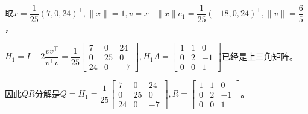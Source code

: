     \begin{solution}
        取$x=\dfrac1{25}(7,0,24)^{\top},\|x\|=1,v=x-\|x\|e_1=\dfrac1{25}(-18,0,24)^{\top},\|v\|=\dfrac65$，

        $H_1=I-2\dfrac{vv^{\top}}{v^{\top}v}=\dfrac1{25}\begin{bmatrix}7&0&24\\0&25&0\\24&0&-7\end{bmatrix},H_1 A=\begin{bmatrix}1&1&0\\0&2&-1\\0&0&1\end{bmatrix}$已经是上三角矩阵。

        因此$QR$分解是$Q=H_1=\dfrac1{25}\begin{bmatrix}7&0&24\\0&25&0\\24&0&-7\end{bmatrix},R=\begin{bmatrix}1&1&0\\0&2&-1\\0&0&1\end{bmatrix}$。
    \end{solution}

